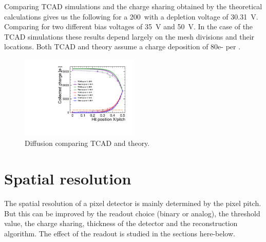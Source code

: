 Comparing TCAD simulations and the charge sharing obtained by the
theoretical calculations gives us the following for a 200~\micron with
a depletion voltage of 30.31~V. Comparing for two different bias
voltages of 35~V and 50~V. In the case of the TCAD
simulations these results depend largely on the mesh divisions and
their locations. Both TCAD and theory assume a charge deposition of
80e- per \micron.

\begin{figure}[htbp]
  \centering
  \includegraphics[width=0.5\textwidth]{figures/ChargeSharing/tcad_vs_theory.pdf}
  \caption{Diffusion comparing TCAD and theory.}\label{fig:}
\end{figure}


\section{Spatial resolution}

The spatial resolution of a pixel detector is mainly determined by the pixel
pitch. But this can be improved by the readout choice (binary or
analog), the threshold value, the charge sharing, thickness of the
detector and the reconstruction algorithm. The effect of the readout
is studied in the sections here-below.

